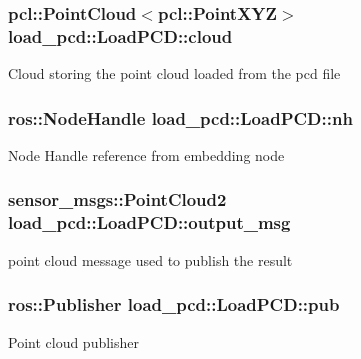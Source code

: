 \subsubsection[{\texorpdfstring{cloud}{cloud}}]{\setlength{\rightskip}{0pt plus 5cm}pcl\+::\+Point\+Cloud$<$pcl\+::\+Point\+X\+YZ$>$ load\+\_\+pcd\+::\+Load\+P\+C\+D\+::cloud\hspace{0.3cm}{\ttfamily [private]}}\hypertarget{classload__pcd_1_1_load_p_c_d_a3a00c45c42111b42373154c364950842}{}\label{classload__pcd_1_1_load_p_c_d_a3a00c45c42111b42373154c364950842}
Cloud storing the point cloud loaded from the pcd file 
\subsubsection[{\texorpdfstring{nh}{nh}}]{\setlength{\rightskip}{0pt plus 5cm}ros\+::\+Node\+Handle load\+\_\+pcd\+::\+Load\+P\+C\+D\+::nh\hspace{0.3cm}{\ttfamily [private]}}\hypertarget{classload__pcd_1_1_load_p_c_d_a6e3e3bd9a8feea013787115296426d30}{}\label{classload__pcd_1_1_load_p_c_d_a6e3e3bd9a8feea013787115296426d30}
Node Handle reference from embedding node 
\subsubsection[{\texorpdfstring{output\+\_\+msg}{output_msg}}]{\setlength{\rightskip}{0pt plus 5cm}sensor\+\_\+msgs\+::\+Point\+Cloud2 load\+\_\+pcd\+::\+Load\+P\+C\+D\+::output\+\_\+msg\hspace{0.3cm}{\ttfamily [private]}}\hypertarget{classload__pcd_1_1_load_p_c_d_a598d6d8452e88cfc42dbb9f383f2d63e}{}\label{classload__pcd_1_1_load_p_c_d_a598d6d8452e88cfc42dbb9f383f2d63e}
point cloud message used to publish the result 
\subsubsection[{\texorpdfstring{pub}{pub}}]{\setlength{\rightskip}{0pt plus 5cm}ros\+::\+Publisher load\+\_\+pcd\+::\+Load\+P\+C\+D\+::pub\hspace{0.3cm}{\ttfamily [private]}}\hypertarget{classload__pcd_1_1_load_p_c_d_aa05fe1d30c2b35d0af4c3936b102bb59}{}\label{classload__pcd_1_1_load_p_c_d_aa05fe1d30c2b35d0af4c3936b102bb59}
Point cloud publisher 

